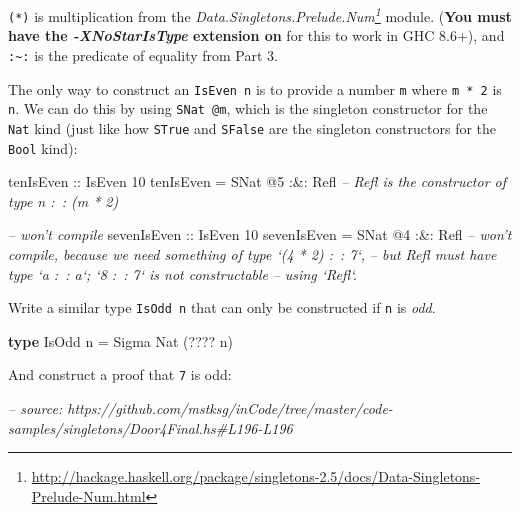 \documentclass[]{article}
\newenvironment{Shaded}{}{}
\newcommand{\CommentTok}[1]{\textcolor[rgb]{0.38,0.63,0.69}{\textit{#1}}}
\newcommand{\DataTypeTok}[1]{\textcolor[rgb]{0.56,0.13,0.00}{#1}}
\newcommand{\DecValTok}[1]{\textcolor[rgb]{0.25,0.63,0.44}{#1}}
\newcommand{\FunctionTok}[1]{\textcolor[rgb]{0.02,0.16,0.49}{#1}}
\newcommand{\KeywordTok}[1]{\textcolor[rgb]{0.00,0.44,0.13}{\textbf{#1}}}
\newcommand{\NormalTok}[1]{#1}
\newcommand{\OtherTok}[1]{\textcolor[rgb]{0.00,0.44,0.13}{#1}}
\renewcommand{\href}[2]{#2\footnote{\url{#1}}}
\begin{document}
\begin{enumerate}
  \texttt{(*)} is multiplication from the
  \emph{\href{http://hackage.haskell.org/package/singletons-2.5/docs/Data-Singletons-Prelude-Num.html}{Data.Singletons.Prelude.Num}}
  module. (\textbf{You must have the \emph{-XNoStarIsType} extension on} for
  this to work in GHC 8.6+), and \texttt{:\textasciitilde{}:} is the predicate
  of equality from Part 3.

  The only way to construct an \texttt{IsEven\ n} is to provide a number
  \texttt{m} where \texttt{m\ *\ 2} is \texttt{n}. We can do this by using
  \texttt{SNat\ @m}, which is the singleton constructor for the \texttt{Nat}
  kind (just like how \texttt{STrue} and \texttt{SFalse} are the singleton
  constructors for the \texttt{Bool} kind):

\begin{Shaded}
\begin{Highlighting}[]
\OtherTok{tenIsEven ::} \DataTypeTok{IsEven} \DecValTok{10}
\NormalTok{tenIsEven }\FunctionTok{=} \DataTypeTok{SNat} \FunctionTok{@}\DecValTok{5} \FunctionTok{:&:} \DataTypeTok{Refl}      \CommentTok{-- Refl is the constructor of type n :~: (m * 2)}

\CommentTok{-- won't compile}
\OtherTok{sevenIsEven ::} \DataTypeTok{IsEven} \DecValTok{10}
\NormalTok{sevenIsEven }\FunctionTok{=} \DataTypeTok{SNat} \FunctionTok{@}\DecValTok{4} \FunctionTok{:&:} \DataTypeTok{Refl}
    \CommentTok{-- won't compile, because we need something of type `(4 * 2) :~: 7`,}
    \CommentTok{-- but Refl must have type `a :~: a`; `8 :~: 7` is not constructable}
    \CommentTok{-- using `Refl`.}
\end{Highlighting}
\end{Shaded}

  Write a similar type \texttt{IsOdd\ n} that can only be constructed if
  \texttt{n} is \emph{odd}.

\begin{Shaded}
\begin{Highlighting}[]
\KeywordTok{type} \DataTypeTok{IsOdd}\NormalTok{ n }\FunctionTok{=} \DataTypeTok{Sigma} \DataTypeTok{Nat}\NormalTok{ (}\FunctionTok{????}\NormalTok{ n)}
\end{Highlighting}
\end{Shaded}

  And construct a proof that \texttt{7} is odd:

\begin{Shaded}
\begin{Highlighting}[]
\CommentTok{-- source: https://github.com/mstksg/inCode/tree/master/code-samples/singletons/Door4Final.hs#L196-L196}


\end{Highlighting}
\end{Shaded}
\end{enumerate}
\end{document}
